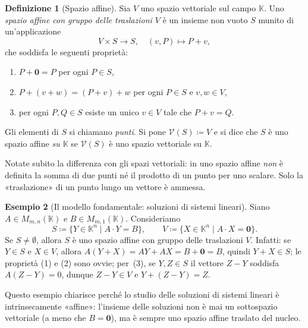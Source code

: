 \documentclass[11pt, a4paper]{book}
\theoremstyle{definition}
\newtheorem{definizione}{Definizione}[section]
\newtheorem{esempio}[definizione]{Esempio}
\theoremstyle{plain}
\theoremstyle{remark}
\newcommand{\K}{\mathbb{K}}
\newcommand{\VV}{\mathcal{V}}   %
\begin{document}
\begin{defbox}
\begin{definizione}[Spazio affine]
\label{def:spazio-affine}
Sia $V$ uno spazio vettoriale sul campo $\K$. Uno \emph{spazio affine con gruppo delle traslazioni $V$} è un insieme non vuoto $S$ munito di un'applicazione
\[
  V \times S \longrightarrow S, \quad (v, P) \longmapsto P + v,
\]
che soddisfa le seguenti proprietà:
\begin{enumerate}
  \item $P + \mathbf{0} = P$ per ogni $P \in S$,
  \item $P + (v + w) = (P + v) + w$ per ogni $P \in S$ e $v, w \in V$,
  \item per ogni $P, Q \in S$ esiste un unico $v \in V$ tale che $P + v = Q$.
\end{enumerate}
Gli elementi di $S$ si chiamano \emph{punti}. Si pone $\VV(S) \coloneqq V$ e si dice che $S$ è uno spazio affine \emph{su $\K$} se $\VV(S)$ è uno spazio vettoriale su $\K$.
\end{definizione}
\end{defbox}

Notate subito la differenza con gli spazi vettoriali: in uno spazio affine \emph{non} è definita la somma di due punti né il prodotto di un punto per uno scalare. Solo la «traslazione» di un punto lungo un vettore è ammessa.

\begin{exbox}
\begin{esempio}[Il modello fondamentale: soluzioni di sistemi lineari]
\label{es:spazio-affine-sistemi}
Siano $A \in M_{m,n}(\K)$ e $B \in M_{m,1}(\K)$. Consideriamo
\[
  S \coloneqq \{ Y \in \K^n \mid A \cdot Y = B \}, \qquad V \coloneqq \{ X \in \K^n \mid A \cdot X = \mathbf{0} \}.
\]
Se $S \neq \emptyset$, allora $S$ è uno spazio affine con gruppo delle traslazioni $V$. Infatti: se $Y \in S$ e $X \in V$, allora $A(Y + X) = AY + AX = B + \mathbf{0} = B$, quindi $Y + X \in S$; le proprietà (1) e (2) sono ovvie; per~(3), se $Y, Z \in S$ il vettore $Z - Y$ soddisfa $A(Z - Y) = 0$, dunque $Z - Y \in V$ e $Y + (Z - Y) = Z$.

Questo esempio chiarisce perché lo studio delle soluzioni di sistemi lineari è intrinsecamente «affine»: l'insieme delle soluzioni non è mai un sottospazio vettoriale (a meno che $B = \mathbf{0}$), ma è sempre uno spazio affine traslato del nucleo.
\end{esempio}
\end{exbox}
\end{document}
